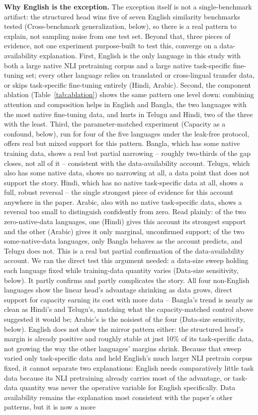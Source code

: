 \documentclass[manuscript]{acmart}
\begin{document}
\textbf{Why English is the exception.} The exception itself is not a single-benchmark artifact: the structured head wins five of seven English similarity benchmarks tested (Cross-benchmark generalization, below), so there is a real pattern to explain, not sampling noise from one test set. Beyond that, three pieces of evidence, not one experiment purpose-built to test this, converge on a data-availability explanation. First, English is the only language in this study with both a large native NLI pretraining corpus and a large native task-specific fine-tuning set; every other language relies on translated or cross-lingual transfer data, or skips task-specific fine-tuning entirely (Hindi, Arabic). Second, the component ablation (Table~\ref{tab:ablation}) shows the same pattern one level down: combining attention and composition helps in English and Bangla, the two languages with the most native fine-tuning data, and hurts in Telugu and Hindi, two of the three with the least. Third, the parameter-matched experiment (Capacity as a confound, below), run for four of the five languages under the leak-free protocol, offers real but mixed support for this pattern. Bangla, which has some native training data, shows a real but partial narrowing -- roughly two-thirds of the gap closes, not all of it -- consistent with the data-availability account. Telugu, which also has some native data, shows no narrowing at all, a data point that does not support the story. Hindi, which has no native task-specific data at all, shows a full, robust reversal -- the single strongest piece of evidence for this account anywhere in the paper. Arabic, also with no native task-specific data, shows a reversal too small to distinguish confidently from zero. Read plainly: of the two zero-native-data languages, one (Hindi) gives this account its strongest support and the other (Arabic) gives it only marginal, unconfirmed support; of the two some-native-data languages, only Bangla behaves as the account predicts, and Telugu does not. This is a real but partial confirmation of the data-availability account. We ran the direct test this argument needed: a data-size sweep holding each language fixed while training-data quantity varies (Data-size sensitivity, below). It partly confirms and partly complicates the story. All four non-English languages show the linear head's advantage shrinking as data grows, direct support for capacity earning its cost with more data -- Bangla's trend is nearly as clean as Hindi's and Telugu's, matching what the capacity-matched control above suggested it would be; Arabic's is the noisiest of the four (Data-size sensitivity, below). English does not show the mirror pattern either: the structured head's margin is already positive and roughly stable at just 10\% of its task-specific data, not growing the way the other languages' margins shrink. Because that sweep varied only task-specific data and held English's much larger NLI pretrain corpus fixed, it cannot separate two explanations: English needs comparatively little task data because its NLI pretraining already carries most of the advantage, or task-data quantity was never the operative variable for English specifically. Data availability remains the explanation most consistent with the paper's other patterns, but it is now a more 
\end{document}
